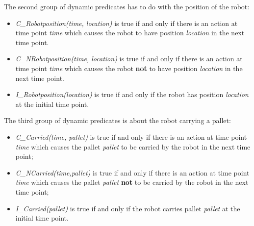 \documentclass[10pt,a4paper]{article}
\begin{document}
The second group of dynamic predicates has to do with the position of the robot: 

\begin{itemize}
  \item \emph{C\_Robotposition(time, location)} is true if and only if there is an action at time point \emph{time} which causes the robot to have position \emph{location} in the next time point.
  \item \emph{C\_NRobotposition(time, location)} is true if and only if there is an action at time point \emph{time} which causes the robot \textbf{not} to have position \emph{location} in the next time point.
  \item \emph{I\_Robotposition(location)} is true if and only if the robot has position \emph{location} at the initial time point.
  \end{itemize}   
 
 The third group of dynamic predicates is about the robot carrying a pallet:
  \begin{itemize} 
  \item \emph{C\_Carried(time, pallet)} is true if and only if there is an action at time point \emph{time} which causes the pallet \emph{pallet} to be carried by the robot in the next time point;
  \item \emph{C\_NCarried(time,pallet)} is true if and only if there is an action at time point \emph{time} which causes the pallet \emph{pallet} \textbf{not} to be carried by the robot in the next time point;
  \item \emph{I\_Carried(pallet)} is true if and only if the robot carries pallet \emph{pallet} at the initial time point.
 \end{itemize}
 
\end{document}
